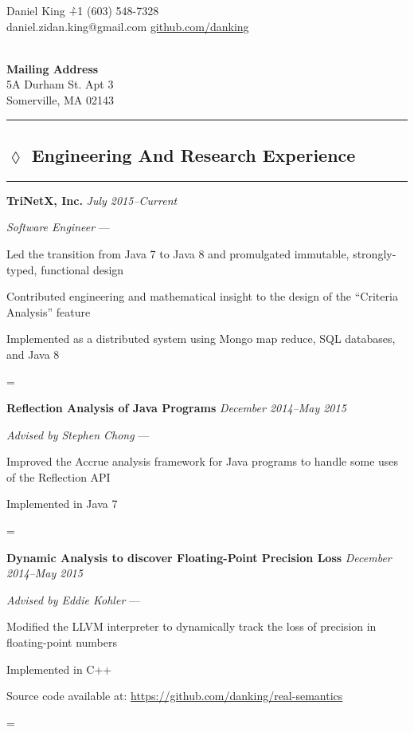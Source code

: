 \documentclass[10pt]{article}
\newenvironment{absolutelynopagebreak}
  {\par\nobreak\vfil\penalty0\vfilneg
   \vtop\bgroup}
  {\par\xdef\tpd{\the\prevdepth}\egroup
   \prevdepth=\tpd}
\newenvironment{my-itemize}
  {\begin{itemize*}
   \renewcommand{\labelitemi}{$\angle$}
  }
  {\end{itemize*}}
\newcommand{\job}[6]{
  \begin{absolutelynopagebreak}
  \vspace{-5pt}
  \begin{tabbing} {\bf #1} \` {\small \textit{#3}} \end{tabbing}
  \vspace{-12pt}
  \begin{my-itemize}
  \setlength\itemsep{1pt}
  \item [] {\textit{#4} \ifthenelse{\equal{#5}{}}
                                   {}
                                   {--- #5}}
  #6
  \end{my-itemize}%
  \end{absolutelynopagebreak}
  \vspace{-18pt}
}
\newcommand{\heading}[2]{
  \vspace{1.5em}
  \subsection*{\hspace{-.9em}$\lozenge$ #1}
  \vspace{-12pt}
  \rule{2in}{.5pt}
  \vspace{-1em}
  #2
}
\begin{document}
\begin{tabbing}{\Huge Daniel King} \`+1 (603) 548-7328\\
\normalsize daniel.zidan.king@gmail.com \`\url{github.com/danking}
\end{tabbing}

\vspace{-15pt}

\begin{tabbing}
                                        \`\\
\textbf{Mailing Address}                \`\\
5A Durham St. Apt 3                     \`\\
Somerville, MA 02143                    \`\\
\end{tabbing}
\vspace{-25pt}
\rule{\linewidth}{.1pt}

\vspace{-2em}
\heading{Engineering And Research Experience}

\job{TriNetX, Inc.}
    {Cambridge, MA}
    {July 2015--Current}
    {Software Engineer}
    {}{
    \item{Led the transition from Java 7 to Java 8 and promulgated immutable,
      strongly-typed, functional design}
    \item{Contributed engineering and mathematical insight to the design of the
      ``Criteria Analysis'' feature}
    \item{Implemented as a distributed system using Mongo map reduce, SQL
      databases, and Java 8}

}

\job{Reflection Analysis of Java Programs}
    {}
    {December 2014--May 2015}
    {Advised by Stephen Chong}
    {}{
  \item{Improved the Accrue analysis framework for Java programs to handle
      some uses of the Reflection API}
  \item{Implemented in Java 7}
}

\job{Dynamic Analysis to discover Floating-Point Precision Loss}
    {}
    {December 2014--May 2015}
    {Advised by Eddie Kohler}
    {}{
  \item{Modified the LLVM interpreter to dynamically track the loss of precision
    in floating-point numbers}
  \item{Implemented in C++}
  \item{Source code available at: \url{https://github.com/danking/real-semantics}}
}
\end{document}

